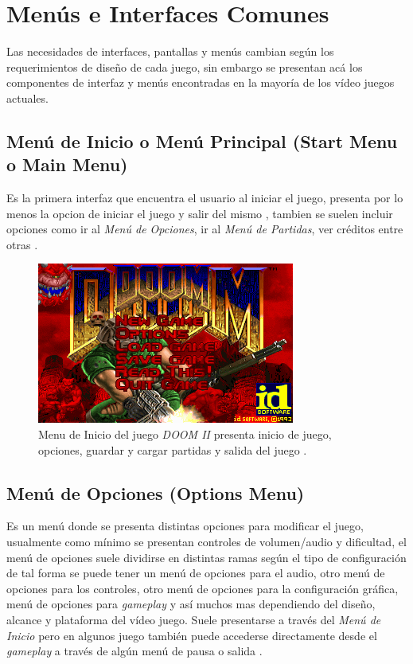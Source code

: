 \section{Menús e Interfaces Comunes}
Las necesidades de interfaces, pantallas y menús cambian según los requerimientos de diseño de cada juego, sin embargo se presentan acá los componentes de interfaz y menús encontradas en la mayoría de los vídeo juegos actuales.
\subsection{Menú de Inicio o Menú Principal (Start Menu o Main Menu)}
Es la primera interfaz que encuentra el usuario al iniciar el juego, presenta por lo menos la opcion de iniciar el juego y salir del mismo \cite[p.~28]{jenkinscreatinggames}, tambien se suelen incluir opciones como ir al \emph{Menú de Opciones}, ir al \emph{Menú de Partidas}, ver créditos entre otras \cite{mainmenu}.~\\

\begin{figure}[H]
\centering
\includegraphics[width=0.55\linewidth]{media/doom_start.png} 
\caption{Menu de Inicio del juego \emph{DOOM II} presenta inicio de juego, opciones, guardar y cargar partidas y salida del juego \cite{doomii}.}
\end{figure}

\subsection{Menú de Opciones (Options Menu)}
Es un menú donde se presenta distintas opciones para modificar el juego, usualmente como mínimo se presentan controles de volumen/audio y dificultad, el menú de opciones suele dividirse en distintas ramas según el tipo de configuración de tal forma se puede tener un menú de opciones para el audio, otro menú de opciones para los controles, otro menú de opciones para la configuración gráfica, menú de opciones para \emph{gameplay} y así muchos mas dependiendo del diseño, alcance y plataforma del vídeo juego. Suele presentarse a través del \emph{Menú de Inicio} pero en algunos juego también puede accederse directamente desde el \emph{gameplay} a través de algún menú de pausa o salida \cite{gb_optionsmenu}.

